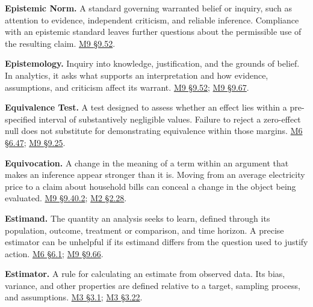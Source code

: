 \noindent\textbf{Epistemic Norm.} A standard governing warranted belief or
inquiry, such as attention to evidence, independent criticism, and
reliable inference. Compliance with an epistemic standard leaves further
questions about the permissible use of the resulting claim.
\hyperref[M09-truth-warrant-and-the-different-force-of-norms]{M9
§9.52}.

\noindent\textbf{Epistemology.} Inquiry into knowledge, justification, and the
grounds of belief. In analytics, it asks what supports an interpretation
and how evidence, assumptions, and criticism affect its warrant.
\hyperref[M09-truth-warrant-and-the-different-force-of-norms]{M9
§9.52};
\hyperref[M09-philosophical-grounds-for-the-critique]{M9
§9.67}.

\noindent\textbf{Equivalence Test.} A test designed to assess whether an effect
lies within a pre-specified interval of substantively negligible values.
Failure to reject a zero-effect null does not substitute for
demonstrating equivalence within those margins.
\href{Marketing_Analytics_Lecture_Notes.pdf\#M06-choosing-the-null-for-a-claim-about-harm}{M6
§6.47};
\hyperref[M09-evidence-for-a-small-burden]{M9
§9.25}.

\noindent\textbf{Equivocation.} A change in the meaning of a term within an
argument that makes an inference appear stronger than it is. Moving from
an average electricity price to a claim about household bills can
conceal a change in the object being evaluated.
\hyperref[M09-the-question-and-the-meaning-of-its-terms]{M9
§9.40.2};
\href{Marketing_Analytics_Lecture_Notes.pdf\#M02-electricity-prices-household-bills-and-the-unit-of-harm}{M2
§2.28}.

\noindent\textbf{Estimand.} The quantity an analysis seeks to learn, defined
through its population, outcome, treatment or comparison, and time
horizon. A precise estimator can be unhelpful if its estimand differs
from the question used to justify action.
\href{Marketing_Analytics_Lecture_Notes.pdf\#M06-define-the-treatment-outcome-and-estimand}{M6
§6.1};
\hyperref[M09-statistical-virtues-and-ontological-laziness]{M9
§9.66}.

\noindent\textbf{Estimator.} A rule for calculating an estimate from observed
data. Its bias, variance, and other properties are defined relative to a
target, sampling process, and assumptions.
\href{Marketing_Analytics_Lecture_Notes.pdf\#M03-a-conditional-mean-and-a-regression-line}{M3
§3.1};
\href{Marketing_Analytics_Lecture_Notes.pdf\#M03-unbiased-estimation-and-the-consequences-of-error}{M3
§3.22}.

